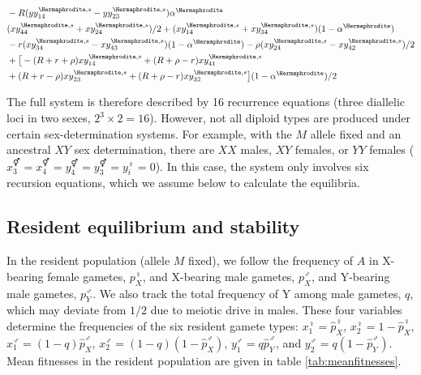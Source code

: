 \documentclass[12pt]{article}
\begin{document}
\begin{subequations}
\begin{align}
\begin{split}
&-R(yy_{14}^{\Hermaphrodite,s}-yy_{23}^{\Hermaphrodite,s}) \alpha^\Hermaphrodite\\
&(xy_{44}^{\Hermaphrodite,s}+xy_{24}^{\Hermaphrodite,s})/2+(xy_{14}^{\Hermaphrodite,s}+xy_{34}^{\Hermaphrodite,s})(1-\alpha^\Hermaphrodite)\\
&- r(xy_{34}^{\Hermaphrodite,s}-xy_{43}^{\Hermaphrodite,s})(1-\alpha^\Hermaphrodite) - \rho(xy_{24}^{\Hermaphrodite,s}-xy_{42}^{\Hermaphrodite,s})/2\\
&+\big{[}-(R+r+\rho) xy_{14}^{\Hermaphrodite,s} + (R+\rho-r)xy_{41}^{\Hermaphrodite,s}\\
&+(R+r-\rho) xy_{23}^{\Hermaphrodite,s} + (R+\rho-r) xy_{32}^{\Hermaphrodite,s}\big{]}(1-\alpha^\Hermaphrodite)/2
\end{split}
\end{align}
\label{eq:recursions}
\end{subequations}

\endgroup

\noindent
The full system is therefore described by 16 recurrence equations (three diallelic loci in two sexes, $2^3 \times 2 = 16$). 
However, not all diploid types are produced under certain sex-determination systems. 
For example, with the $M$ allele fixed and an ancestral $XY$ sex determination, there are $XX$ males, $XY$ females, or $YY$ females ($x_{3}^\Hermaphrodite=x_{4}^\Hermaphrodite=y_{4}^\Hermaphrodite=y_{3}^\Hermaphrodite=y_{i}^\female=0$). 
In this case, the system only involves six recursion equations, %
which we assume below to calculate the equilibria. 


\subsection*{Resident equilibrium and stability}

In the resident population (allele $M$ fixed), we follow the frequency of $A$ in X-bearing female gametes, $p^\female_X$, and X-bearing male gametes, $p^\male_X$, and Y-bearing male gametes, $p^\male_Y$.
We also track the total frequency of Y among male gametes, $q$, which may deviate from $1/2$ due to meiotic drive in males. 
These four variables determine the frequencies of the six resident gamete types: $x_{1}^{\female}=\hat{p}_X^\female$, $x_{2}^{\female}=1-\hat{p}_X^\female$, $x_{1}^{\male}=(1-q)\hat{p}_X^\male$, $x_{2}^{\male}=(1-q)(1-\hat{p}_X^\male)$, $y_{1}^{\male}=q \hat{p}_Y^\male$, and $y_{2}^{\male}=q(1-\hat{p}_Y^\male)$. 
Mean fitnesses in the resident population are given in table \ref{tab:meanfitnesses}.
\end{document}
